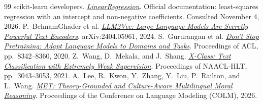 \documentclass{article}
\begin{document}
\begin{thebibliography}{99}
 scikit-learn developers. \href{https://scikit-learn.org/stable/modules/generated/sklearn.linear_model.LinearRegression.html}{\emph{LinearRegression}}. Official documentation: least-squares regression with an intercept and non-negative coefficients. Consulted November 4, 2026.
 P.~BehnamGhader et al. \href{https://arxiv.org/abs/2404.05961}{\emph{LLM2Vec: Large Language Models Are Secretly Powerful Text Encoders}}. arXiv:2404.05961, 2024.
 S.~Gururangan et al. \href{https://aclanthology.org/2020.acl-main.740/}{\emph{Don't Stop Pretraining: Adapt Language Models to Domains and Tasks}}. Proceedings of ACL, pp.~8342--8360, 2020.
 Z.~Wang, D.~Mekala, and J.~Shang. \href{https://aclanthology.org/2021.naacl-main.242/}{\emph{X-Class: Text Classification with Extremely Weak Supervision}}. Proceedings of NAACL-HLT, pp.~3043--3053, 2021.
 A.~Lee, R.~Kwon, Y.~Zhang, Y.~Liu, P.~Railton, and L.~Wang. \href{https://arxiv.org/abs/2607.11736}{\emph{MET: Theory-Grounded and Culture-Aware Multilingual Moral Reasoning}}. Proceedings of the Conference on Language Modeling (COLM), 2026.
\end{thebibliography}
\end{document}
